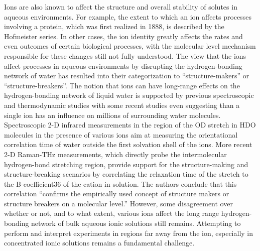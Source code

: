 \documentclass[11pt, proquest]{uwthesis}[2020/02/24]
\begin{document}
\par Ions are also known to affect the structure and overall stability of solutes in aqueous environments. For example, the extent to which an ion affects processes involving a protein, which was first realized in 1888,\autocite{hofmeister_zur_1888} is described by the Hofmeister series. In other cases, the ion identity greatly affects the rates and even outcomes of certain biological processes,\autocite{zhang_interactions_2006} with the molecular level mechanism responsible for these changes still not fully understood. The view that the ions affect processes in aqueous environments by disrupting the hydrogen-bonding network of water\autocite{marcus_effect_2009} has resulted into their categorization to “structure-makers” or “structure-breakers”.\autocite{collins_hofmeister_1985} The notion that ions can have long-range effects on the hydrogen-bonding network of liquid water is supported by previous spectroscopic\autocite{omta_influence_2003,omta_negligible_2003,kropman_vibrational_2003,kropman_effect_2004} and thermodynamic\autocite{batchelor_impact_2004} studies with some recent studies even suggesting than a single ion has an influence on millions of surrounding water molecules.\autocite{chen_electrolytes_2016} Spectroscopic 2-D infrared measurements in the region of the OD stretch in HDO molecules in the presence of various ions aim at measuring the orientational correlation time of water outside the first solvation shell of the ions. More recent 2-D Raman-THz measurements, which directly probe the intermolecular hydrogen-bond stretching region, provide support for the structure-making and structure-breaking scenarios by correlating the relaxation time of the stretch to the B-coefficient36 of the cation in solution.\autocite{shalit_terahertz_2017} The authors conclude that this correlation “confirms the empirically used concept of structure makers or structure breakers on a molecular level.”\autocite{shalit_terahertz_2017} However, some disagreement over whether or not, and to what extent, various ions affect the long range hydrogen-bonding network of bulk aqueous ionic solutions still remains. Attempting to perform and interpret experiments in regions far away from the ion, especially in concentrated ionic solutions remains a fundamental challenge.
\end{document}
